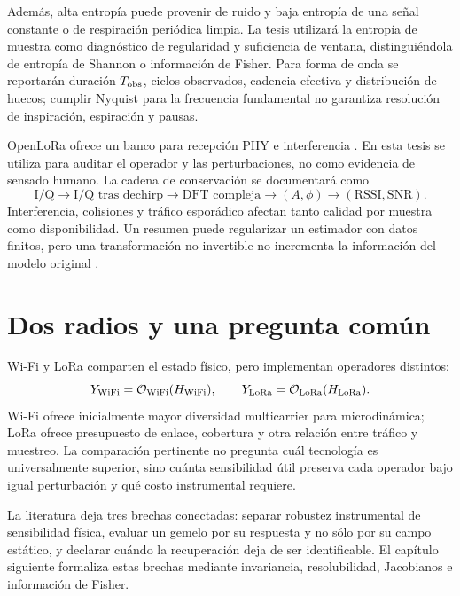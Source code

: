 Además, alta entropía puede provenir de ruido y baja entropía de una señal constante
o de respiración periódica limpia. La tesis utilizará la entropía de muestra como
diagnóstico de regularidad y suficiencia de ventana, distinguiéndola de entropía de
Shannon o información de Fisher. Para forma de onda se reportarán duración
$T_{\rm obs}$, ciclos observados, cadencia efectiva y distribución de huecos; cumplir
Nyquist para la frecuencia fundamental no garantiza resolución de inspiración,
espiración y pausas.

OpenLoRa ofrece un banco para recepción PHY e interferencia
\citep{Mishra2023OpenLoRa}. En esta tesis se utiliza para auditar el operador y
las perturbaciones, no como evidencia de sensado humano. La cadena de conservación
se documentará como
\[
\text{I/Q}\rightarrow\text{I/Q tras dechirp}\rightarrow
\text{DFT compleja}\rightarrow(A,\phi)\rightarrow
(\mathrm{RSSI},\mathrm{SNR}).
\]
Interferencia, colisiones y tráfico esporádico afectan tanto calidad por muestra
como disponibilidad. Un resumen puede regularizar un estimador con datos finitos,
pero una transformación no invertible no incrementa la información del modelo
original \citep{Kay1993,CoverThomas2006}.

\section{Dos radios y una pregunta común}

Wi-Fi y LoRa comparten el estado físico, pero implementan operadores distintos:
\begin{equation}
Y_{\rm WiFi}=\mathcal O_{\rm WiFi}(H_{\rm WiFi}),\qquad
Y_{\rm LoRa}=\mathcal O_{\rm LoRa}(H_{\rm LoRa}).
\end{equation}
Wi-Fi ofrece inicialmente mayor diversidad multicarrier para microdinámica; LoRa
ofrece presupuesto de enlace, cobertura y otra relación entre tráfico y muestreo.
La comparación pertinente no pregunta cuál tecnología es universalmente superior,
sino cuánta sensibilidad útil preserva cada operador bajo igual perturbación y
qué costo instrumental requiere.

La literatura deja tres brechas conectadas: separar robustez instrumental de
sensibilidad física, evaluar un gemelo por su respuesta y no sólo por su campo
estático, y declarar cuándo la recuperación deja de ser identificable. El capítulo
siguiente formaliza estas brechas mediante invariancia, resolubilidad, Jacobianos
e información de Fisher.
